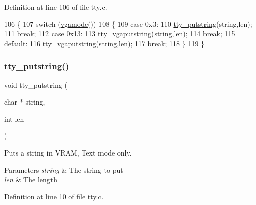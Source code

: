 Definition at line 106 of file tty.\+c.


\begin{DoxyCode}
106                                             \{
107     \textcolor{keywordflow}{switch} (\hyperlink{a00041_af6d170c9401ea8f94d4c5cf09347cca7_af6d170c9401ea8f94d4c5cf09347cca7}{vgamode}())
108     \{
109     \textcolor{keywordflow}{case} 0x3:
110         \hyperlink{a00140_a5b5bf610a57f3c59b2851fa2652081ec_a5b5bf610a57f3c59b2851fa2652081ec}{tty\_putstring}(\textcolor{keywordtype}{string},len);
111         \textcolor{keywordflow}{break};
112     \textcolor{keywordflow}{case} 0x13:
113         \hyperlink{a00140_a05ca3f5e64f38fec173b635ca8465415_a05ca3f5e64f38fec173b635ca8465415}{tty\_vgaputstring}(\textcolor{keywordtype}{string},len);
114         \textcolor{keywordflow}{break};
115     \textcolor{keywordflow}{default}:
116         \hyperlink{a00140_a05ca3f5e64f38fec173b635ca8465415_a05ca3f5e64f38fec173b635ca8465415}{tty\_vgaputstring}(\textcolor{keywordtype}{string},len);
117         \textcolor{keywordflow}{break};
118     \}
119 \}
\end{DoxyCode}
\mbox{\label{a00143_a5b5bf610a57f3c59b2851fa2652081ec_a5b5bf610a57f3c59b2851fa2652081ec}} 
\subsubsection{\texorpdfstring{tty\+\_\+putstring()}{tty\_putstring()}}
{\footnotesize\ttfamily void tty\+\_\+putstring (\begin{DoxyParamCaption}\item[{char $\ast$}]{string,  }\item[{int}]{len }\end{DoxyParamCaption})}



Puts a string in V\+R\+AM, Text mode only. 


\begin{DoxyParams}{Parameters}
{\em string} & The string to put \\
\hline
{\em len} & The length \\
\hline
\end{DoxyParams}


Definition at line 10 of file tty.\+c.


